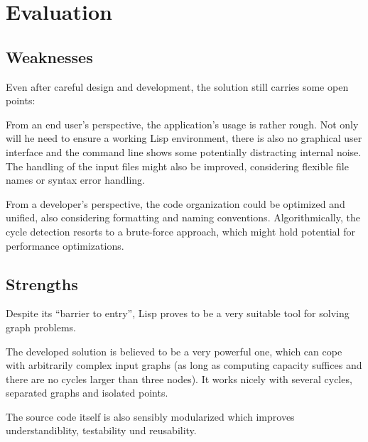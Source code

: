 \chapter{Evaluation}

  \section{Weaknesses}
  
    Even after careful design and development, the solution still carries some
    open points:
    
    From an end user's perspective, the application's usage is rather rough. Not
    only will he need to ensure a working Lisp environment, there is also no
    graphical user interface and the command line shows some potentially
    distracting internal noise. The handling of the input files might also be
    improved, considering flexible file names or syntax error handling.
    
    From a developer's perspective, the code organization could be optimized and
    unified, also considering formatting and naming conventions.
    Algorithmically, the cycle detection resorts to a brute-force approach,
    which might hold potential for performance optimizations.
  
  \section{Strengths}
  
    Despite its ``barrier to entry'', Lisp proves to be a very suitable tool for
    solving graph problems.
    
    The developed solution is believed to be a very powerful one, which can cope
    with arbitrarily complex input graphs (as long as computing capacity
    suffices and there are no cycles larger than three nodes). It works nicely
    with several cycles, separated graphs and isolated points.
    
    The source code itself is also sensibly modularized which improves
    understandiblity, testability und reusability.
 
